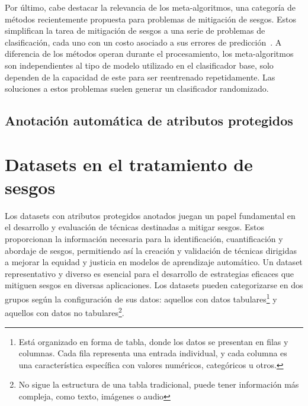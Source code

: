 Por \'ultimo, cabe destacar la relevancia de los meta-algoritmos, una categor\'ia de m\'etodos recientemente propuesta para problemas de 
mitigaci\'on de sesgos. Estos simplifican la tarea de mitigaci\'on de sesgos a una serie de problemas de clasificaci\'on, cada uno con 
un costo asociado a sus errores de predicci\'on~\parencite{agarwal2018reductions, agarwal2019fair}.
A diferencia de los m\'etodos operan durante el procesamiento, los meta-algoritmos son independientes al tipo de modelo utilizado en el 
clasificador base, solo dependen de la capacidad de este para ser reentrenado repetidamente. Las soluciones a estos problemas suelen generar
un clasificador randomizado.

\subsection{Anotaci\'on autom\'atica de atributos protegidos}


\section{Datasets en el tratamiento de sesgos}

    Los datasets con atributos protegidos anotados juegan un papel fundamental en el desarrollo y evaluaci\'on de t\'ecnicas destinadas 
    a mitigar sesgos. Estos proporcionan la informaci\'on necesaria para la identificaci\'on, cuantificaci\'on y abordaje de sesgos, 
    permitiendo as\'i la creaci\'on y validaci\'on de t\'ecnicas dirigidas a mejorar la equidad y justicia en modelos de aprendizaje 
    autom\'atico. 
    Un dataset representativo y diverso es esencial para el desarrollo de estrategias eficaces que mitiguen sesgos en diversas aplicaciones. 
    Los datasets pueden categorizarse en dos grupos seg\'un la configuraci\'on de sus datos: 
    aquellos con datos tabulares\footnote{Est\'a organizado en forma de tabla, donde los datos se presentan en filas y columnas. Cada fila 
    representa una entrada individual, y cada columna es una caracter\'istica espec\'ifica con valores num\'ericos, categ\'oricos u otros.} 
    y aquellos con datos no tabulares\footnote{No sigue la estructura de una tabla tradicional, puede tener informaci\'on m\'as compleja, como 
    texto, im\'agenes o audio}.
    

